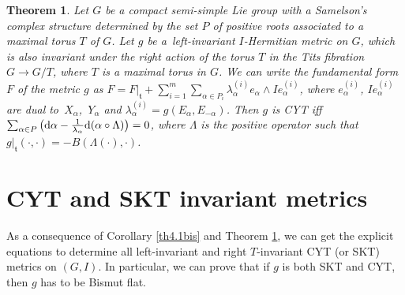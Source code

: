 \documentclass[pdftex]{sigma}
\numberwithin{equation}{section}
\newtheorem{Theorem}{Theorem}[section]
\begin{document}
\begin{Theorem} \label{th4.1}
Let $G$ be a compact semi-simple Lie group with a Samelson's complex structure determined by the set $P$ of positive roots associated to a maximal torus $T$ of $G$. Let $g$ be a~left-invariant $I$-Hermitian metric on $G$, which is also invariant under the right action of the torus $T$ in the Tits fibration $G\rightarrow G/T$, where $T$ is a maximal torus in $G$. We can write the fundamental form $F$ of the metric $g$
as $F = F|_{\mathfrak t} + \sum_{i=1}^m \sum_{\alpha \in P_i} \lambda_{\alpha} ^{(i)} e_{\alpha}\wedge I e_{\alpha}^{(i)}$, where $e_{\alpha}^{(i)}$, $Ie_{\alpha}^{(i)}$ are dual to~$X_{\alpha}$,~$Y_{\alpha}$ and $\lambda_{\alpha} ^{(i)}= g (E_{\alpha}, E_{-\alpha})$. Then
$g$ is CYT iff $\sum_{\alpha \in P} \big({\rm d}\alpha - \frac{1}{\lambda_{\alpha}} {\rm d}(\alpha\circ\Lambda) \big) = 0$, where $\Lambda$ is the positive operator such that $g |_{\mathfrak t} (\cdot, \cdot ) = -B (\Lambda (\cdot), \cdot)$.
\end{Theorem}

\section{CYT and SKT invariant metrics}

As a consequence of Corollary \ref{th4.1bis} and Theorem \ref{th4.1}, we can get the explicit equations to determine all left-invariant and right $T$-invariant CYT (or SKT) metrics on $(G, I).$ In particular, we can prove that if $g$ is both SKT and CYT, then $g$ has to be Bismut flat.
\end{document}
